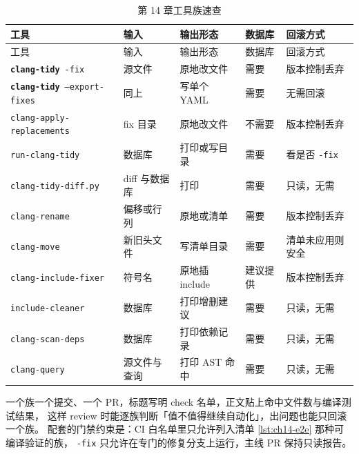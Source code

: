 \documentclass[12pt,a4paper,fontset=fandol]{ctexbook}
\newcommand{\Bk}{\discretionary{}{}{}}
\newcommand{\Lib}[1]{\textbf{\texttt{#1}}}
\newcommand{\Tidy}{\Lib{clang-tidy}}
\begin{document}
\begin{longtable}{>{\raggedright\arraybackslash}p{}>{\raggedright\arraybackslash}p{}>{\raggedright\arraybackslash}p{}>{\raggedright\arraybackslash}p{}>{\raggedright\arraybackslash}p{}}
\caption{第 14 章工具族速查}\label{tab:ch14-tools}\\
\toprule
工具 & 输入 & 输出形态 & 数据库 & 回滚方式 \\
\midrule
\endfirsthead
\toprule
工具 & 输入 & 输出形态 & 数据库 & 回滚方式 \\
\midrule
\endhead
\Tidy\ \texttt{-fix} & 源文件 & 原地改文件 & 需要 & 版本控制丢弃 \\
\Tidy\ \texttt{--export-}\Bk\texttt{fixes} & 同上 & 写单个 YAML & 需要 & 无需回滚 \\
\texttt{clang-apply-}\Bk\texttt{replacements} & fix 目录 & 原地改文件 & 不需要 & 版本控制丢弃 \\
\texttt{run-clang-}\Bk\texttt{tidy} & 数据库 & 打印或写目录 & 需要 & 看是否 \texttt{-fix} \\
\texttt{clang-tidy-}\Bk\texttt{diff.py} & diff 与数据库 & 打印 & 需要 & 只读，无需 \\
\texttt{clang-rename} & 偏移或行列 & 原地或清单 & 需要 & 版本控制丢弃 \\
\texttt{clang-move} & 新旧头文件 & 写清单目录 & 需要 & 清单未应用则安全 \\
\texttt{clang-include-}\Bk\texttt{fixer} & 符号名 & 原地插 include & 建议提供 & 版本控制丢弃 \\
\texttt{include-}\Bk\texttt{cleaner} & 数据库 & 打印增删建议 & 需要 & 只读，无需 \\
\texttt{clang-scan-}\Bk\texttt{deps} & 数据库 & 打印依赖记录 & 需要 & 只读，无需 \\
\texttt{clang-query} & 源文件与查询 & 打印 AST 命中 & 需要 & 只读，无需 \\
\bottomrule
\end{longtable}

\begin{bestpractice}[title={把 autofix 当作一次一个族的提交}]
一个族一个提交、一个 PR，标题写明 check 名单，正文贴上命中文件数与编译测试结果，
这样 review 时能逐族判断「值不值得继续自动化」，出问题也能只回滚一个族。
配套的门禁约束是：CI 白名单里只允许列入清单 \ref{lst:ch14-e2e} 那种可编译验证的族，
\texttt{-fix} 只允许在专门的修复分支上运行，主线 PR 保持只读报告。
\end{bestpractice}

\end{document}
